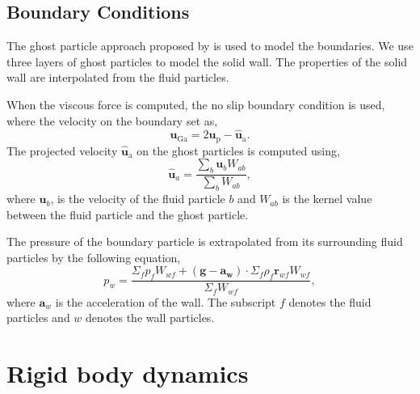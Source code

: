 \documentclass[preprint,12pt]{elsarticle}
\newcommand{\ten}[1]{\ensuremath{\mathbf{#1}}}
\begin{document}
\FloatBarrier%
\subsection{Boundary Conditions}
\label{sec:boundary_conditions}

The ghost particle approach proposed by \citet{Adami2012} is used to model the
boundaries. We use three layers of ghost particles to model the solid wall.
The properties of the solid wall are interpolated from the fluid particles.

When the viscous force is computed, the no slip boundary condition is used,
where the velocity on the boundary set as,
\begin{equation}
  \label{eq:no-slip-bc-u}
  \ten{u}_{\text{Ga}} = 2 \ten{u}_{\text{p}} - \ten{\hat{u}}_{\text{a}}.
\end{equation}
The projected velocity $\ten{\hat{u}}_{\text{a}}$ on the ghost particles is
computed using,
\begin{equation}
  \label{eq:v-ghost}
  \ten{\hat{u}}_a = \frac{\sum_b\ten{u}_b W_{ab}}{\sum_b W_{ab}},
\end{equation}
where $\ten{u}_b$, is the velocity of the fluid particle $b$ and $W_{ab}$ is the kernel
value between the fluid particle and the ghost particle.


The pressure of the boundary particle is extrapolated from its surrounding
fluid particles by the following equation,
\begin{equation}
  \label{eq:pressure-bc}
  p_w = \frac{\Sigma_f p_f W_{wf} + (\ten{g} - \ten{a}_{\ten{w}}) \cdot \Sigma_f
    \rho_f \ten{r}_{wf} W_{wf}}{\Sigma_f W_{wf}},
\end{equation}
where $\ten{a}_w$ is the acceleration of the wall. The subscript $f$ denotes
the fluid particles and $w$ denotes the wall particles.



\FloatBarrier%
\section{Rigid body dynamics}
\label{sec:rbd}

\end{document}
